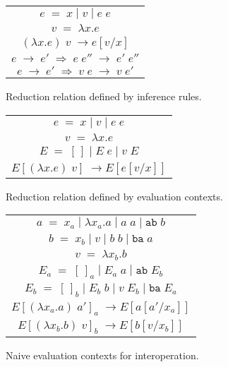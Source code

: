 \begin{figure}[htb]
\onehalfspacing
\centering
\begin{tabular}{c}
$e \; = \; x \; | \; v \; | \; e \; e$ \\
$v \; = \; \lambda x.e$ \\
$(\lambda x.e) \; v \; \rightarrow e[v/x]$ \\
$e \; \rightarrow \; e' \; \Rightarrow \; e \; e'' \; \rightarrow \; e' \; e''$ \\
$e \; \rightarrow \; e' \; \Rightarrow \; v \; e \; \rightarrow \; v \; e'$ \\
\end{tabular}
\caption{Reduction relation defined by inference rules.}
\label{figinf}
\end{figure}

\begin{figure}[htb]
\onehalfspacing
\centering
\begin{tabular}{c}
$e \; = \; x \; | \; v \; | \; e \; e$ \\
$v \; = \; \lambda x.e$ \\
$E \; = \; [\,] \; | \; E \; e \; | \; v \; E$ \\
$E[(\lambda x.e) \; v] \; \rightarrow E[e[v/x]]$ \\
\end{tabular}
\caption{Reduction relation defined by evaluation contexts.}
\label{figcon}
\end{figure}

\begin{figure}[htb]
\onehalfspacing
\centering
\begin{tabular}{c}
$a \; = \; x_a \; | \; \lambda x_a.a \; | \; a \; a \; | \; \mathtt{ab} \; b$ \\
$b \; = \; x_b \; | \; v \; | \; b \; b \; | \; \mathtt{ba} \; a$ \\
$v \; = \; \lambda x_b.b$ \\
$E_a \; = \; [\,]_a \; | \; E_a \; a \; | \; \mathtt{ab} \; E_b$ \\
$E_b \; = \; [\,]_b \; | \; E_b \; b \; | \; v \; E_b \; | \; \mathtt{ba} \; E_a$ \\
$E[(\lambda x_a.a) \; a']_a \; \rightarrow E[a[a'/x_a]]$ \\
$E[(\lambda x_b.b) \; v]_b \; \rightarrow E[b[v/x_b]]$ \\
\end{tabular}
\caption{Naive evaluation contexts for interoperation.}
\label{fignai}
\end{figure}

